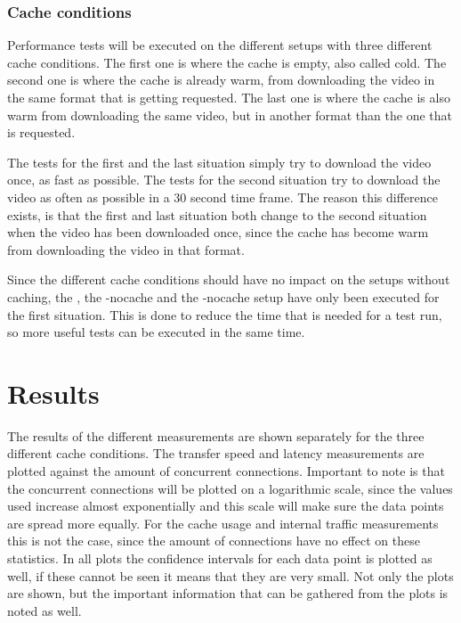 \documentclass[twoside,openright]{uva-bachelor-thesis}
\begin{document}
\subsubsection{Cache conditions}
Performance tests will be executed on the different setups with three different
cache conditions. The first one is where the cache is empty, also called cold.
The second one is where the cache is already warm, from downloading the video in
the same format that is getting requested. The last one is where the cache is
also warm from downloading the same video, but in another format than the one
that is requested.

The tests for the first and the last situation simply try to download the video
once, as fast as possible. The tests for the second situation try to download
the video as often as possible in a 30 second time frame. The reason this
difference exists, is that the first and last situation both change to the
second situation when the video has been downloaded once, since the cache has
become warm from downloading the video in that format.

Since the different cache conditions should have no impact on the setups without
caching, the \ipp, the \cdn-nocache and the \lt-nocache setup have only been
executed for the first situation. This is done to reduce the time that is needed
for a test run, so more useful tests can be executed in the same time.





\section{Results}
The results of the different measurements are shown separately for the three
different cache conditions. The transfer speed and latency measurements are
plotted against the amount of concurrent connections. Important to note is that
the concurrent connections will be plotted on a logarithmic scale, since the
values used increase almost exponentially and this scale will make sure the data
points are spread more equally. For the cache usage and internal traffic
measurements this is not the case, since the amount of connections have no
effect on these statistics. In all plots the confidence intervals for each data
point is plotted as well, if these cannot be seen it means that they are very
small. Not only the plots are shown, but the important information that can be
gathered from the plots is noted as well.
\end{document}
